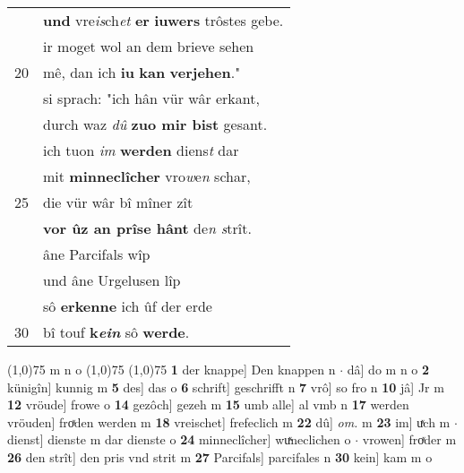 \documentclass[8pt,a4paper,notitlepage]{article}
\begin{document}
\begin{table}[ht]
\begin{minipage}[t]{0.5\linewidth}
\begin{tabular}{rl}
 & \textbf{und} vre\textit{is}ch\textit{et} \textbf{er} \textbf{iuwers} trôstes gebe.\\ 
 & ir moget wol an dem brieve sehen\\ 
20 & mê, dan ich \textbf{iu} \textbf{kan} \textbf{verjehen}."\\ 
 & si sprach: "ich hân vür wâr erkant,\\ 
 & durch waz \textit{dû} \textbf{zuo mir bist} gesant.\\ 
 & ich tuon \textit{im} \textbf{werden} diens\textit{t} dar\\ 
 & mit \textbf{minneclîcher} vro\textit{w}e\textit{n} schar,\\ 
25 & die vür wâr bî mîner zît\\ 
 & \textbf{vor ûz an prîse hânt} de\textit{n s}trît.\\ 
 & âne Parcifals wîp\\ 
 & und âne Urgelusen lîp\\ 
 & sô \textbf{erkenne} ich ûf der erde\\ 
30 & bî touf \textbf{k\textit{ein}} sô \textbf{werde}.\\ 
\end{tabular}
\scriptsize
\line(1,0){75} \newline
m n o \newline
\line(1,0){75} \newline
\newline
\line(1,0){75} \newline
\textbf{1} der knappe] Den knappen n  $\cdot$ dâ] do m n o \textbf{2} künigîn] kunnig m \textbf{5} des] das o \textbf{6} schrift] geschrifft n \textbf{7} vrô] so fro n \textbf{10} jâ] Jr m \textbf{12} vröude] frowe o \textbf{14} gezôch] gezeh m \textbf{15} umb alle] al vmb n \textbf{17} werden vröuden] froͯden werden m \textbf{18} vreischet] frefeclich m \textbf{22} dû] \textit{om.} m \textbf{23} im] uͯch m  $\cdot$ dienst] dienste m dar dienste o \textbf{24} minneclîcher] wuͯneclichen o  $\cdot$ vrowen] froͯder m \textbf{26} den strît] den pris vnd strit m \textbf{27} Parcifals] parcifales n \textbf{30} kein] kam m o \newline
\end{minipage}
\end{table}
\newpage
\end{document}
